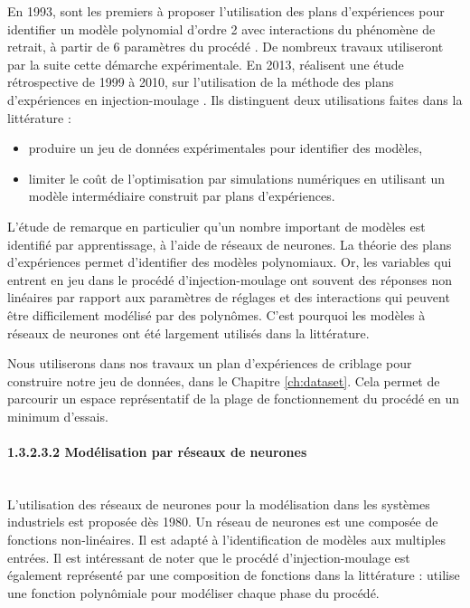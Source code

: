 En 1993, \citeauthor{regnier_local_1993} sont les premiers à proposer l'utilisation des plans d'expériences pour identifier un modèle polynomial d'ordre 2 avec interactions du phénomène de retrait, à partir de 6 paramètres du procédé \cite{regnier_local_1993, regnier_experimental_1994}.
De nombreux travaux utiliseront par la suite cette démarche expérimentale.
En 2013, \citeauthor{fei_practical_2013} réalisent une étude rétrospective de 1999 à 2010, sur l’utilisation de la méthode des plans d'expériences en injection-moulage \cite{fei_practical_2013}.  %
Ils distinguent deux utilisations faites dans la littérature :
\begin{itemize}
	\item produire un jeu de données expérimentales pour identifier des modèles,
	\item limiter le coût de l'optimisation par simulations numériques en utilisant un modèle intermédiaire construit par plans d'expériences.
\end{itemize}

L'étude de \citeauthor{fei_practical_2013} remarque en particulier qu'un nombre important de modèles est identifié par apprentissage, à l'aide de réseaux de neurones.
La théorie des plans d'expériences permet d'identifier des modèles polynomiaux.
Or, les variables qui entrent en jeu dans le procédé d'injection-moulage ont souvent des réponses non linéaires par rapport aux paramètres de réglages et des interactions qui peuvent être difficilement modélisé par des polynômes.
C'est pourquoi les modèles à réseaux de neurones ont été largement utilisés dans la littérature.

Nous utiliserons dans nos travaux un plan d'expériences de criblage pour construire notre jeu de données, dans le Chapitre \ref{ch:dataset}.
Cela permet de parcourir un espace représentatif de la plage de fonctionnement du procédé en un minimum d'essais.

\paragraph{1.3.2.3.2 Modélisation par réseaux de neurones}\mbox{} \label{parag:molding_neural} \\
L'utilisation des réseaux de neurones pour la modélisation dans les systèmes industriels est proposée dès 1980.
Un réseau de neurones est une composée de fonctions non-linéaires.
Il est adapté à l'identification de modèles aux multiples entrées.
Il est intéressant de noter que le procédé d'injection-moulage est également représenté par une composition de fonctions dans la littérature : \citeauthor{ma_design_1974} \cite{ma_design_1974} utilise une fonction polynômiale pour modéliser chaque phase du procédé.

